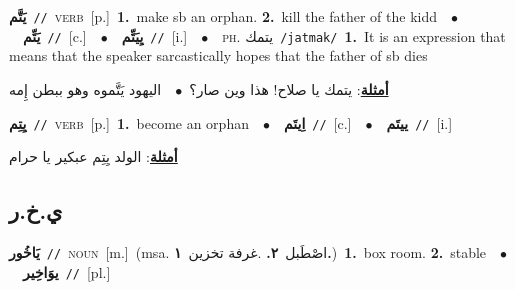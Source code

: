 \documentclass[10pt,a4paper,twoside]{article} %
\begin{document}
\begin{multicols}{2}
{\setlength\topsep{0pt}\textbf{\foreignlanguage{arabic}{يَتَّم}}\ {\color{gray}\texttt{//}\color{black}}\ \textsc{verb}\ [p.]\ \textbf{1.}~make sb an orphan.  \textbf{2.}~kill the father of the kidd\ \ $\bullet$\ \ \setlength\topsep{0pt}\textbf{\foreignlanguage{arabic}{يَتِّم}}\ {\color{gray}\texttt{//}\color{black}}\ [c.]\ \ $\bullet$\ \ \setlength\topsep{0pt}\textbf{\foreignlanguage{arabic}{يِيَتِّم}}\ {\color{gray}\texttt{//}\color{black}}\ [i.]\ \ $\bullet$\ \ \textsc{ph.} \color{gray} \foreignlanguage{arabic}{يتمك}\color{black}\ {\color{gray}\texttt{/{\sffamily jatmak}/}\color{black}}\ \textbf{1.}~It is an expression that means that the speaker sarcastically hopes that the father of sb dies\  \begin{flushright}\color{gray}\foreignlanguage{arabic}{\textbf{\underline{\foreignlanguage{arabic}{أمثلة}}}: يتمك يا صلاح! هذا وين صار؟\ $\bullet$\ \  اليهود يَتَّموه وهو ببطن إِمه}\end{flushright}\color{black}} \vspace{2mm}

{\setlength\topsep{0pt}\textbf{\foreignlanguage{arabic}{يِتِم}}\ {\color{gray}\texttt{//}\color{black}}\ \textsc{verb}\ [p.]\ \textbf{1.}~become an orphan\ \ $\bullet$\ \ \setlength\topsep{0pt}\textbf{\foreignlanguage{arabic}{اِيتَم}}\ {\color{gray}\texttt{//}\color{black}}\ [c.]\ \ $\bullet$\ \ \setlength\topsep{0pt}\textbf{\foreignlanguage{arabic}{ييتَم}}\ {\color{gray}\texttt{//}\color{black}}\ [i.]\  \begin{flushright}\color{gray}\foreignlanguage{arabic}{\textbf{\underline{\foreignlanguage{arabic}{أمثلة}}}: الولد يِتِم عبكير يا حرام}\end{flushright}\color{black}} \vspace{2mm}

\vspace{-3mm}
\subsection*{\color{blue}\foreignlanguage{arabic}{ي.خ.ر}\color{blue}{ (ntws)}} 

{\setlength\topsep{0pt}\textbf{\foreignlanguage{arabic}{يَاخُور}}\ {\color{gray}\texttt{//}\color{black}}\ \textsc{noun}\ [m.]\ \color{gray}(msa. \foreignlanguage{arabic}{اصْطَبل}~\foreignlanguage{arabic}{\textbf{٢.}}  .\foreignlanguage{arabic}{غرفة تخزين}~\foreignlanguage{arabic}{\textbf{١.}})\color{black}\ \textbf{1.}~box room.  \textbf{2.}~stable\ \ $\bullet$\ \ \setlength\topsep{0pt}\textbf{\foreignlanguage{arabic}{يوَاخِير}}\ {\color{gray}\texttt{//}\color{black}}\ [pl.]\ } \vspace{2mm}


\end{multicols}
\end{document}
